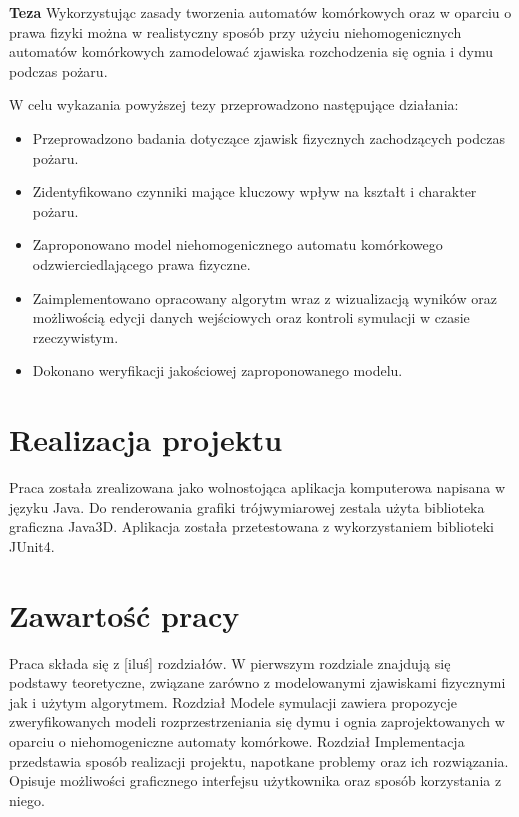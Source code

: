


\textbf{Teza} Wykorzystując zasady tworzenia automatów komórkowych oraz w oparciu o prawa fizyki można w realistyczny sposób
przy użyciu niehomogenicznych 
automatów komórkowych
zamodelować zjawiska rozchodzenia się ognia i dymu podczas pożaru.

W celu wykazania powyższej tezy przeprowadzono następujące działania:
\begin{itemize}
\item Przeprowadzono badania dotyczące zjawisk fizycznych zachodzących podczas pożaru.
\item Zidentyfikowano czynniki mające kluczowy wpływ na kształt i charakter pożaru.
\item Zaproponowano model niehomogenicznego automatu komórkowego odzwierciedlającego prawa fizyczne.
\item Zaimplementowano opracowany algorytm wraz z wizualizacją wyników oraz możliwością edycji danych wejściowych oraz kontroli symulacji w czasie rzeczywistym.
\item Dokonano weryfikacji jakościowej zaproponowanego modelu.
\end{itemize}

\section {Realizacja projektu} %
Praca została zrealizowana jako wolnostojąca aplikacja komputerowa napisana w języku Java. Do renderowania grafiki trójwymiarowej
zestala użyta biblioteka graficzna Java3D. Aplikacja została przetestowana z wykorzystaniem biblioteki JUnit4. 

\section{Zawartość pracy} %
Praca składa się z [iluś] rozdziałów. 
W pierwszym rozdziale znajdują się podstawy teoretyczne, związane zarówno z modelowanymi zjawiskami fizycznymi jak i użytym algorytmem.
Rozdział Modele symulacji zawiera propozycje zweryfikowanych modeli rozprzestrzeniania się dymu i ognia zaprojektowanych w oparciu
o niehomogeniczne automaty komórkowe. Rozdział Implementacja przedstawia sposób realizacji projektu, napotkane problemy oraz 
ich rozwiązania. Opisuje możliwości graficznego interfejsu użytkownika oraz sposób korzystania z niego.
